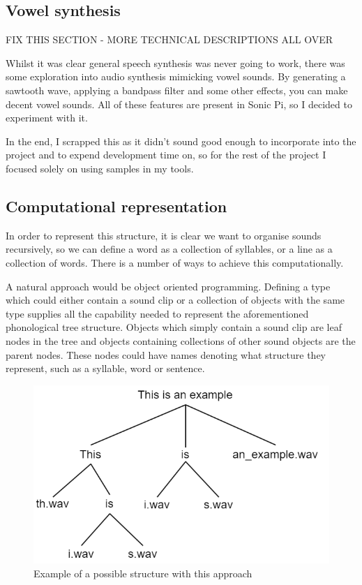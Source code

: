 \documentclass[12pt,a4paper,twoside,openright]{report}
\begin{document}
\subsection{Vowel synthesis}
FIX THIS SECTION - MORE TECHNICAL DESCRIPTIONS ALL OVER


Whilst it was clear general speech synthesis was never going to work, there was some exploration into audio synthesis mimicking vowel sounds. By generating a sawtooth wave, applying a bandpass filter and some other effects, you can make decent vowel sounds. All of these features are present in Sonic Pi, so I decided to experiment with it.

In the end, I scrapped this as it didn't sound good enough to incorporate into the project and to expend development time on, so for the rest of the project I focused solely on using samples in my tools.

\subsection{Computational representation}\label{sec:comp_rep}
In order to represent this structure, it is clear we want to organise sounds recursively, so we can define a word as a collection of syllables, or a line as a collection of words. There is a number of ways to achieve this computationally.

A natural approach would be object oriented programming. Defining a type which could either contain a sound clip or a collection of objects with the same type supplies all the capability needed to represent the aforementioned phonological tree structure. Objects which simply contain a sound clip are leaf nodes in the tree and objects containing collections of other sound objects are the parent nodes. These nodes could have names denoting what structure they represent, such as a syllable, word or sentence.

\begin{figure}[h!]
    \centering
    \includegraphics[scale=0.5]{images/tree_structure_example.png}
    \caption{Example of a possible structure with this approach}
    \label{fig:tree_struct_ex}
\end{figure}
\end{document}
